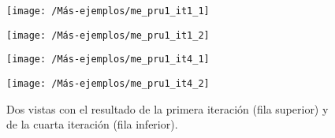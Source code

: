 \begin{figure}[h!]	
	\begin{minipage}[b]{0.5\textwidth}
		\centering		
		\texttt{[image: /Más-ejemplos/me\_pru1\_it1\_1]} 
	\end{minipage}
	\begin{minipage}[b]{0.5\textwidth}
		\centering
		\texttt{[image: /Más-ejemplos/me\_pru1\_it1\_2]}
	\end{minipage}
	\begin{minipage}[b]{0.5\textwidth}
		\centering		
		\texttt{[image: /Más-ejemplos/me\_pru1\_it4\_1]} 
	\end{minipage}
	\begin{minipage}[b]{0.5\textwidth}
		\centering
		\texttt{[image: /Más-ejemplos/me\_pru1\_it4\_2]}
	\end{minipage}
	\caption{Dos vistas con el resultado de la primera iteración (fila superior) y de la cuarta iteración (fila inferior).}
	\label{fig:ICPtorre}
\end{figure}

\begin{comment}
EN los segundos me salía entorno a 17!!!! con cota unos 0.003
\end{comment}

